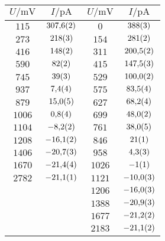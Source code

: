 \begin{table}[H]
{\begin{tabular}{cc||cc}
\hline
$U / \unit{\milli\volt}$ & $I / \unit{\pico\ampere}$ & $U / \unit{\milli\volt}$ & $I / \unit{\pico\ampere}$ \\ 
\hline
$\num{115}$ & $\num{307.6\pm 0.2}$ & $\num{0}$ & $\num{388\pm 3}$ \\
$\num{273}$ & $\num{218\pm 3}$ & $\num{154}$ & $\num{281\pm 2}$ \\
$\num{416}$ & $\num{148\pm 2}$ & $\num{311}$ & $\num{200.5\pm 0.2}$ \\
$\num{590}$ & $\num{82\pm 2}$ & $\num{415}$ & $\num{147.5\pm 0.3}$ \\
$\num{745}$ & $\num{39\pm 3}$ & $\num{529}$ & $\num{100.0\pm 0.2}$ \\
$\num{937}$ & $\num{7.4\pm 0.4}$ & $\num{575}$ & $\num{83.5\pm 0.4}$ \\
$\num{879}$ & $\num{15.0\pm 0.5}$ & $\num{627}$ & $\num{68.2\pm 0.4}$ \\
$\num{1006}$ & $\num{0.8\pm 0.4}$ & $\num{699}$ & $\num{48.0\pm 0.2}$ \\
$\num{1104}$ & $\num{-8.2\pm 0.2}$ & $\num{761}$ & $\num{38.0\pm 0.5}$ \\
$\num{1208}$ & $\num{-16.1\pm 0.2}$ & $\num{846}$ & $\num{21\pm 1}$ \\
$\num{1406}$ & $\num{-20.7\pm 0.3}$ & $\num{958}$ & $\num{4.3\pm 0.3}$ \\
$\num{1670}$ & $\num{-21.4\pm 0.4}$ & $\num{1026}$ & $\num{-1\pm 1}$ \\
$\num{2782}$ & $\num{-21.1\pm 0.1}$ & $\num{1121}$ & $\num{-10.0\pm 0.3}$ \\
   &    & $\num{1206}$ & $\num{-16.0\pm 0.3}$ \\
   &    & $\num{1388}$ & $\num{-20.9\pm 0.3}$ \\
   &    & $\num{1677}$ & $\num{-21.2\pm 0.2}$ \\
   &    & $\num{2183}$ & $\num{-21.1\pm 0.2}$ \\
\hline\end{tabular}
\label{kennlinie_405nm}
}\end{table}